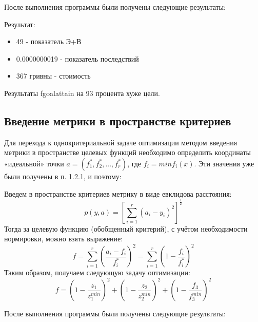 \documentclass[14pt,a4paper,report]{report}
\begin{document}

После выполнения программы были получены следующие результаты:



Результат:
\begin{itemize}
\item 49 - показатель Э+В
\item 0.0000000019 - показатель последствий
\item 367 гривны - стоимость
\end{itemize}

Результаты fgoalattain на 93 процента хуже цели.



















\subsection{Введение метрики в пространстве критериев}

Для перехода к однокритериальной задаче оптимизации методом введения метрики в пространстве целевых функций необходимо определить координаты «идеальной» точки $a=(f_1^*, f_2^*, ..., f_r^*)$,  где $f_i = min f_i(x)$. Эти значения
уже были получены в п. 1.2.1, и поэтому:




Введем в пространстве критериев метрику в виде евклидова расстояния:
\begin{equation}
p(y, a) = [\sum_{i=1}^r(a_i-y_i)^2]^{\frac{1}{2}} 
\end{equation}
Тогда за целевую функцию (обобщенный критерий), с учётом необходимости нормировки, можно взять выражение:
\begin{equation}
f=\sum_{i=1}^r(\frac{a_i-f_i}{f_i^*})^2=\sum_{i=1}^r(1-\frac{f_i}{f_i^*})^2
\end{equation}
Таким образом, получаем следующую задачу оптимизации:
\begin{equation}
f=(1-\frac{z_1}{z_1^{min}})^2+(1-\frac{z_2}{z_2^{min}})^2+(1-\frac{f_3}{f_3^{min}})^2
\end{equation}


После выполнения программы были получены следующие результаты:

\end{document}
